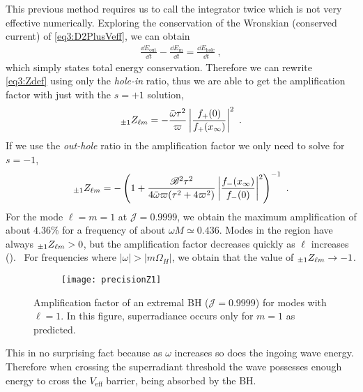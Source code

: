This previous method requires us to call the integrator twice which is not very effective numerically.
Exploring the conservation of the Wronskian (conserved current) of \eqref{eq3:D2PlusVeff}, we can obtain \cite{Teukolsky1974}
\begin{align}
	\label{eq4:InOutHole}
	\frac{\dd E_\mathrm{out}}{\dd t} - \frac{\dd E_\mathrm{in}}{\dd t} = \frac{\dd E_\mathrm{hole}}{\dd t} ~,
\end{align}
which simply states total energy conservation.
Therefore we can rewrite \eqref{eq3:Zdef} using only the \emph{hole-in} ratio, thus we are able to get the amplification factor with just with the $s=+1$ solution,
\begin{align}
	\label{eq4:ZFPlusPlus}
	\uu[\pm 1]{Z}{\ell m} = - \frac{\bar{\omega} \tau^2}{\varpi} \left|\frac{f_{+}(0)}{f_{+}(x_\infty)}\right|^2 ~.
\end{align}
If we use the \emph{out-hole} ratio in the amplification factor we only need to solve for $s=-1$,
\begin{align}
	\label{eq4:ZFMinusMinus}
	\uu[\pm 1]{Z}{\ell m} = - \left( 1 + \frac{\mathscr{B}^2 \tau^2}{4 \bar{\omega} \varpi(\tau^2 + 4 \varpi^2)} \left|\frac{f_{-}(x_\infty)}{f_{-}(0)}\right|^2 \right)^{-1} ~.
\end{align}
For the mode $\ell=m=1$ at $\mathscr{J}=0.9999$, we obtain the maximum amplification of about $4.36\%$ for a frequency of about $\omega M \simeq 0.436$.
Modes in the region  have always $\uu[\pm 1]{Z}{\ell m}>0$, but the amplification factor decreases quickly as $\ell$ increases ().~
For frequencies where $|\omega|>|m\Omega_H|$, we obtain that the value of $\uu[\pm 1]{Z}{\ell m} \to -1$.
\begin{figure}[h]
	\centering
	\vspace{0.2cm}
	\begin{subfigure}[c]{0.6\textwidth}
        \texttt{[image: precisionZ1]}
	\end{subfigure}
	\caption{Amplification factor of an extremal BH ($\mathscr{J}=0.9999$) for modes with $\ell=1$. In this figure, superradiance occurs only for $m=1$ as predicted.}
	\label{fig4:plotZ11}
\end{figure}
This in no surprising fact because as $\omega$ increases so does the ingoing wave energy. Therefore when crossing the superradiant threshold the wave possesses enough energy to cross the $V_\mathrm{eff}$ barrier, being absorbed by the BH.

